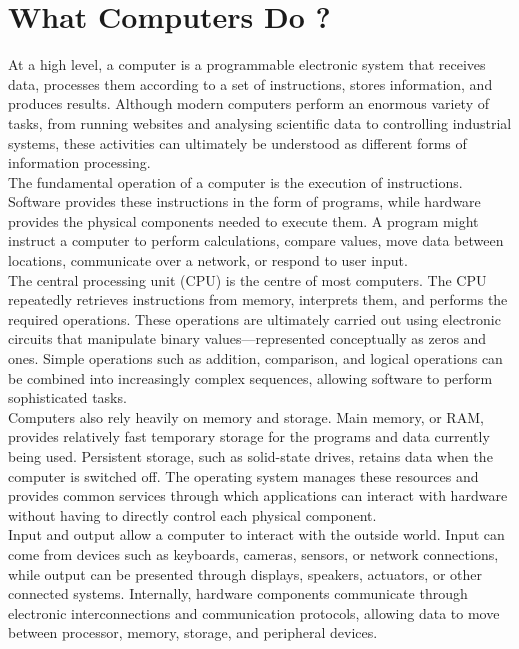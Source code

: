 \section{What Computers Do ?}

At a high level, a computer is a programmable electronic system that receives data, processes them according to a set of instructions, stores information, and produces results. Although modern computers perform an enormous variety of tasks, from running websites and analysing scientific data to controlling industrial systems, these activities can ultimately be understood as different forms of information processing. \\


The fundamental operation of a computer is the execution of instructions. Software provides these instructions in the form of programs, while hardware provides the physical components needed to execute them. A program might instruct a computer to perform calculations, compare values, move data between locations, communicate over a network, or respond to user input.\\

The central processing unit (CPU) is the centre of most computers. The CPU repeatedly retrieves instructions from memory, interprets them, and performs the required operations. These operations are ultimately carried out using electronic circuits that manipulate binary values—represented conceptually as zeros and ones. Simple operations such as addition, comparison, and logical operations can be combined into increasingly complex sequences, allowing software to perform sophisticated tasks. \\

Computers also rely heavily on memory and storage. Main memory, or RAM, provides relatively fast temporary storage for the programs and data currently being used. Persistent storage, such as solid-state drives, retains data when the computer is switched off. The operating system manages these resources and provides common services through which applications can interact with hardware without having to directly control each physical component. \\

Input and output allow a computer to interact with the outside world. Input can come from devices such as keyboards, cameras, sensors, or network connections, while output can be presented through displays, speakers, actuators, or other connected systems. Internally, hardware components communicate through electronic interconnections and communication protocols, allowing data to move between processor, memory, storage, and peripheral devices. \\

